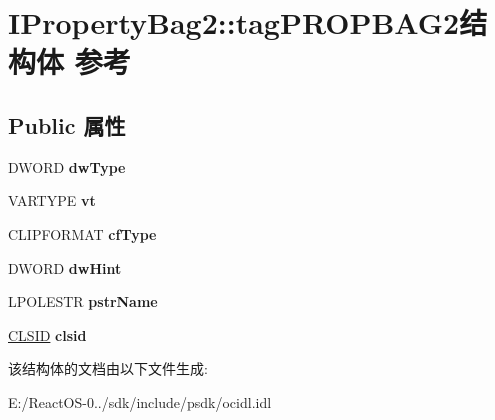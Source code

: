 \hypertarget{struct_i_property_bag2_1_1tag_p_r_o_p_b_a_g2}{}\section{I\+Property\+Bag2\+:\+:tag\+P\+R\+O\+P\+B\+A\+G2结构体 参考}
\label{struct_i_property_bag2_1_1tag_p_r_o_p_b_a_g2}
\subsection*{Public 属性}
\begin{DoxyCompactItemize}
\item 
\mbox{\label{struct_i_property_bag2_1_1tag_p_r_o_p_b_a_g2_a5dce9120b1d656f69487cdd4cf37154e}} 
D\+W\+O\+RD {\bfseries dw\+Type}
\item 
\mbox{\label{struct_i_property_bag2_1_1tag_p_r_o_p_b_a_g2_a5bd01889de08860e18e1e013add351e1}} 
V\+A\+R\+T\+Y\+PE {\bfseries vt}
\item 
\mbox{\label{struct_i_property_bag2_1_1tag_p_r_o_p_b_a_g2_a551c077232636a2133c978225b9fa5b8}} 
C\+L\+I\+P\+F\+O\+R\+M\+AT {\bfseries cf\+Type}
\item 
\mbox{\label{struct_i_property_bag2_1_1tag_p_r_o_p_b_a_g2_ab08851c735fc4d3cda7afbbb2a00eecd}} 
D\+W\+O\+RD {\bfseries dw\+Hint}
\item 
\mbox{\label{struct_i_property_bag2_1_1tag_p_r_o_p_b_a_g2_a26514fee55061c2c54ebc6a3d95e1ec2}} 
L\+P\+O\+L\+E\+S\+TR {\bfseries pstr\+Name}
\item 
\mbox{\label{struct_i_property_bag2_1_1tag_p_r_o_p_b_a_g2_a7472af17c8bfa71bd109984e57afe07b}} 
\hyperlink{struct___i_i_d}{C\+L\+S\+ID} {\bfseries clsid}
\end{DoxyCompactItemize}


该结构体的文档由以下文件生成\+:\begin{DoxyCompactItemize}
\item 
E\+:/\+React\+O\+S-\/0../sdk/include/psdk/ocidl.\+idl\end{DoxyCompactItemize}
